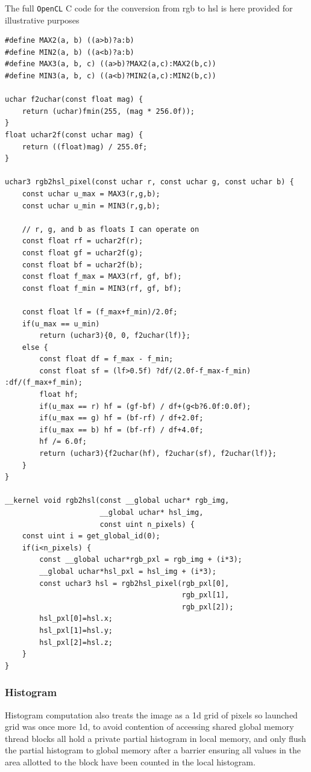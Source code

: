 \documentclass[11pt]{article}
\begin{document}
The full \texttt{OpenCL} C code for the conversion from rgb to hsl is here provided for illustrative purposes

\begin{verbatim}
#define MAX2(a, b) ((a>b)?a:b)
#define MIN2(a, b) ((a<b)?a:b)
#define MAX3(a, b, c) ((a>b)?MAX2(a,c):MAX2(b,c))
#define MIN3(a, b, c) ((a<b)?MIN2(a,c):MIN2(b,c))

uchar f2uchar(const float mag) {
    return (uchar)fmin(255, (mag * 256.0f));
}
float uchar2f(const uchar mag) {
    return ((float)mag) / 255.0f;
}

uchar3 rgb2hsl_pixel(const uchar r, const uchar g, const uchar b) {
    const uchar u_max = MAX3(r,g,b);
    const uchar u_min = MIN3(r,g,b);

    // r, g, and b as floats I can operate on
    const float rf = uchar2f(r);
    const float gf = uchar2f(g);
    const float bf = uchar2f(b);
    const float f_max = MAX3(rf, gf, bf);
    const float f_min = MIN3(rf, gf, bf);

    const float lf = (f_max+f_min)/2.0f;
    if(u_max == u_min)
        return (uchar3){0, 0, f2uchar(lf)};
    else {
        const float df = f_max - f_min;
        const float sf = (lf>0.5f) ?df/(2.0f-f_max-f_min) :df/(f_max+f_min);
        float hf;
        if(u_max == r) hf = (gf-bf) / df+(g<b?6.0f:0.0f);
        if(u_max == g) hf = (bf-rf) / df+2.0f;
        if(u_max == b) hf = (bf-rf) / df+4.0f;
        hf /= 6.0f;
        return (uchar3){f2uchar(hf), f2uchar(sf), f2uchar(lf)};
    }
}

__kernel void rgb2hsl(const __global uchar* rgb_img,
                      __global uchar* hsl_img,
                      const uint n_pixels) {
    const uint i = get_global_id(0);
    if(i<n_pixels) {
        const __global uchar*rgb_pxl = rgb_img + (i*3);
        __global uchar*hsl_pxl = hsl_img + (i*3);
        const uchar3 hsl = rgb2hsl_pixel(rgb_pxl[0],
                                         rgb_pxl[1],
                                         rgb_pxl[2]);
        hsl_pxl[0]=hsl.x;
        hsl_pxl[1]=hsl.y;
        hsl_pxl[2]=hsl.z;
    }
}
\end{verbatim}
\subsubsection{Histogram}
\label{sec:org6b6673a}
Histogram computation also treats the image as a 1d grid of pixels so launched grid was once more 1d, to avoid contention of accessing shared global memory thread blocks all hold a private partial histogram in local memory, and only flush the partial histogram to global memory after a barrier ensuring all values in the area allotted to the block have been counted in the local histogram.
\end{document}
